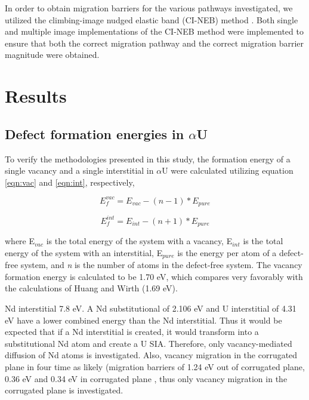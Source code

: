 \documentclass[review]{elsarticle}
\begin{document}
In order to obtain migration barriers for the various pathways investigated, we utilized the climbing-image nudged elastic band (CI-NEB) method \cite{neb1}.  Both single and multiple image implementations of the CI-NEB method were implemented to ensure that both the correct migration pathway and the correct migration barrier magnitude were obtained. 

\section{Results}

\subsection{Defect formation energies in $\alpha$U}

To verify the methodologies presented in this study, the formation energy of a single vacancy and a single interstitial in $\alpha$U were calculated utilizing equation \ref{eqn:vac} and \ref{eqn:int}, respectively,

\begin{equation}
\label{eqn:vac}
E_{f}^{vac} = E_{vac} - (n-1)*E_{pure}
\end{equation} 

\begin{equation}
\label{eqn:int}
E_{f}^{int} = E_{int} - (n+1)*E_{pure}
\end{equation} 

where E$_{vac}$ is the total energy of the system with a vacancy, E$_{int}$ is the total energy of the system with an interstitial, E$_{pure}$ is the energy per atom of a defect-free system, and \textit{n} is the number of atoms in the defect-free system. The vacancy formation energy is calculated to be 1.70 eV, which compares very favorably with the calculations of Huang and Wirth \cite{wirth2011} (1.69 eV).  

Nd interstitial 7.8 eV.  A Nd substitutional of 2.106 eV and U interstitial of 4.31 eV \cite{wirth2012} have a lower combined energy than the Nd interstitial.  Thus it would be expected that if a Nd interstitial is created, it would transform into a substitutional Nd atom and create a U SIA.  Therefore, only vacancy-mediated diffusion of Nd atoms is investigated.  Also, vacancy migration in the corrugated plane in four time as likely (migration barriers of 1.24 eV out of corrugated plane, 0.36 eV and 0.34 eV in corrugated plane \cite{wirth2011}, thus only vacancy migration in the corrugated plane is investigated.  
\end{document}
